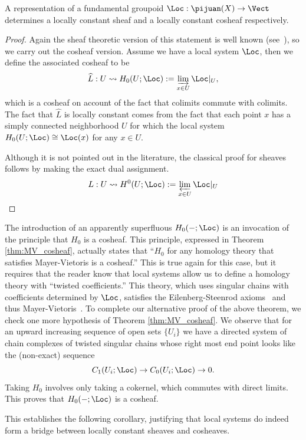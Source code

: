 \begin{thm}\label{thm:rep_lc_sheaf}
	A representation of a fundamental groupoid $\Loc:\pijuan(X)\to\Vect$ determines a locally constant sheaf and a locally constant cosheaf respectively.
\end{thm}
\begin{proof}
	Again the sheaf theoretic version of this statement is well known (see~\cite{achar-lsu}), so we carry out the cosheaf version. Assume we have a local system $\Loc$, then we define the associated cosheaf to be
	\[
	\widehat{L}:U \rightsquigarrow H_0(U;\Loc):=\varinjlim_{x\in U} \Loc|_U,
	\]
	which is a cosheaf on account of the fact that colimits commute with colimits. The fact that $\widehat{L}$ is locally constant comes from the fact that each point $x$ has a simply connected neighborhood $U$ for which the local system $H_0(U;\Loc)\cong \Loc(x)$ for any $x\in U$.
	
	Although it is not pointed out in the literature, the classical proof for sheaves follows by making the exact dual assignment.
	\[
		L: U \rightsquigarrow H^0(U;\Loc):=\varprojlim_{x\in U} \Loc|_U
	\]
\end{proof}
\begin{rmk}
	The introduction of an apparently superfluous $H_0(-;\Loc)$ is an invocation of the principle that $H_0$ is a cosheaf. This principle, expressed in Theorem \ref{thm:MV_cosheaf}, actually states that ``$H_0$ for any homology theory that satisfies Mayer-Vietoris is a cosheaf.'' This is true again for this case, but it requires that the reader know that local systems allow us to define a homology theory with ``twisted coefficients.'' This theory, which uses singular chains with coefficients determined by $\Loc$, satisfies the Eilenberg-Steenrod axioms~\cite[Ch.~6]{whitehead} and thus Mayer-Vietoris~\cite[Ch.~4.6]{spanier}. To complete our alternative proof of the above theorem, we check one more hypothesis of Theorem \ref{thm:MV_cosheaf}. We observe that for an upward increasing sequence of open sets $\{U_i\}$ we have a directed system of chain complexes of twisted singular chains whose right most end point looks like the (non-exact) sequence
	\[
		C_1(U_i;\Loc) \to C_0(U_i;\Loc) \to 0.
	\]
	Taking $H_0$ involves only taking a cokernel, which commutes with direct limits. This proves that $H_0(-;\Loc)$ is a cosheaf.
\end{rmk}

This establishes the following corollary, justifying that local systems do indeed form a bridge between locally constant sheaves and cosheaves.

